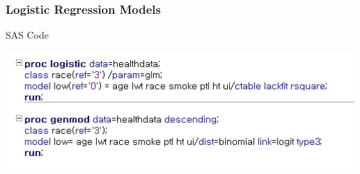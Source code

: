 \documentclass[10pt,xcolor={svgnames},t]{beamer}
\begin{document}
%
\begin{frame}
	\frametitle{Logistic Regression Models}
	
	\begin{block}{SAS Code}
		\begin{center}
			\includegraphics[width=1\textwidth]{ex2.jpg}
		\end{center} 
	\end{block}
	
\end{frame}
\end{document}
